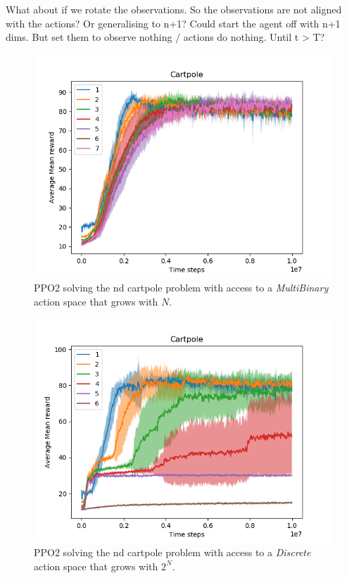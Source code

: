 What about if we rotate the observations. So the observations are not aligned with the actions?
Or generalising to n+1? Could start the agent off with n+1 dims. But set them to observe nothing / actions do nothing. Until t > T?

\begin{figure}
  \centering
  \includegraphics[width=1\textwidth,height=0.5\textheight]{../../pictures/figures/multibinary-nd-cart.png}
  \caption{PPO2 solving the nd cartpole problem with access to a \textit{MultiBinary} action space that grows with $N$.}
\end{figure}

\begin{figure}
\centering
\includegraphics[width=1\textwidth,height=0.5\textheight]{../../pictures/figures/discrete-nd-cart.png}
\caption{PPO2 solving the nd cartpole problem with access to a \textit{Discrete} action space that grows with $2^N$.}
\end{figure}


